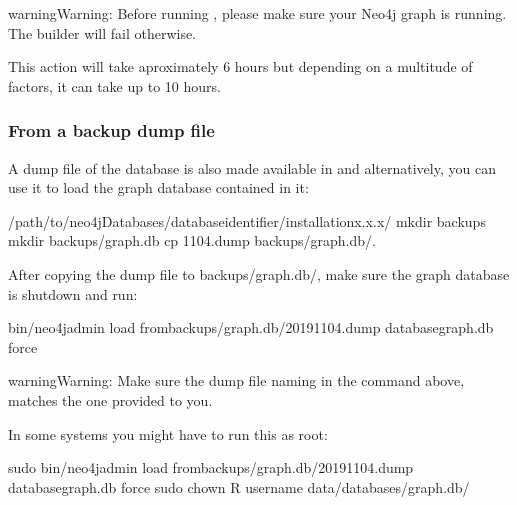 \documentclass[letterpaper,10pt,english]{sphinxmanual}
\begin{document}
\begin{sphinxadmonition}{warning}{Warning:}
Before running , please make sure your Neo4j graph is running. The builder will fail otherwise.
\end{sphinxadmonition}

This action will take aproximately 6 hours but depending on a multitude of factors, it can take up to 10 hours.


\subsubsection{From a backup dump file}
\label{\detokenize{intro/getting-started-with-build:from-a-backup-dump-file}}
A dump file of the database is also made available in  and alternatively, you can use it to load the graph database contained in it:

\begin{sphinxVerbatim}[commandchars=\\\{\}]
\PYGZdl{}  /path/to/neo4jDatabases/database\PYGZhy{}identifier/installation\PYGZhy{}x.x.x/
\PYGZdl{} mkdir backups
\PYGZdl{} mkdir backups/graph.db
\PYGZdl{} cp \PYGZhy{}11\PYGZhy{}04.dump backups/graph.db/.
\end{sphinxVerbatim}

After copying the dump file to backups/graph.db/, make sure the graph database is shutdown and run:

\begin{sphinxVerbatim}[commandchars=\\\{\}]
\PYGZdl{} bin/neo4j\PYGZhy{}admin load \PYGZhy{}\PYGZhy{}frombackups/graph.db/2019\PYGZhy{}11\PYGZhy{}04.dump \PYGZhy{}\PYGZhy{}databasegraph.db \PYGZhy{}\PYGZhy{}force
\end{sphinxVerbatim}

\begin{sphinxadmonition}{warning}{Warning:}
Make sure the dump file naming in the command above, matches the one provided to you.
\end{sphinxadmonition}

In some systems you might have to run this as root:

\begin{sphinxVerbatim}[commandchars=\\\{\}]
\PYGZdl{} sudo bin/neo4j\PYGZhy{}admin load \PYGZhy{}\PYGZhy{}frombackups/graph.db/2019\PYGZhy{}11\PYGZhy{}04.dump \PYGZhy{}\PYGZhy{}databasegraph.db \PYGZhy{}\PYGZhy{}force
\PYGZdl{} sudo chown \PYGZhy{}R username data/databases/graph.db/
\end{sphinxVerbatim}
\end{document}
